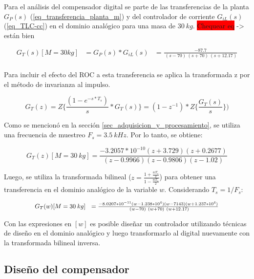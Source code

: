  Para el análisis del compensador digital se parte de las transferencias de la planta $G_P(s)$ (\ref{eq_transferencia_planta_m}) y del controlador de corriente $G_{iL}(s) $ (\ref{eq_TLC-cc}) en el dominio analógico para una masa de $30 \:kg$.
 \colorbox{red}{Chequear eq} -> están bien

\begin{equation} 
	\begin{aligned}
		G_T(s)[M=30kg]&=G_P(s)*G_{iL}(s)&=\frac{-87.7}{\ (s-70)\ (s+70)\ (s+12.17)}\\
	\end{aligned}
\end{equation}



Para incluir el efecto del ROC a esta transferencia se aplica la transformada z por el método de invarianza al impulso. 

\begin{equation*}
	G_T(z)=Z\{\frac{(1-e^{-s*T_s})}{s}*G_T(s)\}=(1-z^{-1})*Z\{\frac{G_T(s)}{s}\})
\end{equation*}

 Como se mencionó en la sección \ref{sec_adquisicion_y_procesamiento}, se utiliza una frecuencia de muestreo  $F_s=3.5\:kHz$. Por lo tanto, se obtiene:

\begin{equation} 
	G_T(z)[M=30\:kg] =\frac{-3.2057*10^{-10}(z+3.729)(z+0.2677)}{(z-0.9966)(z-0.9806) (z-1.02)}
\end{equation}

Luego, se utiliza la transformada bilineal ($z=\frac{1+\frac{wT_s}{2}}{1-\frac{wT_s}{2}}$) para obtener una transferencia en el dominio analógico de la variable $w$. Considerando $T_s=1/F_s$:

\begin{equation} \label{eq_Gtotal_w_m30}
	\resizebox{.8\hsize}{!}
	{
		$G_T(w)[M=30\:kg]\ \ =\frac{-8.0207*10^{-11}(w-1.238*10^4)(w-7143)(w+1.237*10^4)}{\ (w-70)\ (w+70)\ (w+12.17)}$
	}
\end{equation}


Con las expresiones en $[w]$ es posible diseñar un controlador utilizando técnicas de diseño en el dominio analógico y luego transformarlo al digital nuevamente con la transformada bilineal inversa.



\subsection{Diseño del compensador}

